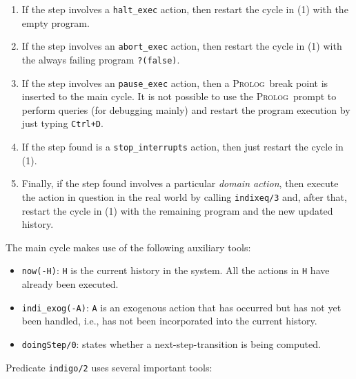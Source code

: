 \documentclass[11pt]{article}
\newcommand{\Prolog}{\mbox{\textsc{Prolog}}}
\begin{document}
\begin{enumerate}
\begin{enumerate}
\begin{enumerate}
\item If the step involves a \texttt{halt\_exec} action, then restart the
cycle in (1) with the empty program.

\item If the step involves an \texttt{abort\_exec} action, then restart the
cycle in (1) with the always failing program \texttt{?(false)}.

\item If the step involves an \texttt{pause\_exec} action, then a
\Prolog\ break point is inserted to the main cycle. It is not possible to
use the \Prolog\ prompt to perform queries (for debugging mainly) and restart
the program execution by just typing \texttt{Ctrl+D}.

\item If the step found is a \texttt{stop\_interrupts} action, then just restart
the cycle in (1).
         
\item Finally, if the step found involves a particular \textit{domain
action}, then execute the action in question in the real world by calling
\texttt{indixeq/3} and, after that, restart the cycle in (1) with the remaining
program and the new updated history.
\end{enumerate}
\end{enumerate}
\end{enumerate}


The main cycle makes use of the following auxiliary tools:

\begin{itemize}
\item \texttt{now(-H)}: \texttt{H} is the current history in the system. All
the actions in \texttt{H} have already been executed.

\item \texttt{indi\_exog(-A)}: \texttt{A} is an exogenous action that has
occurred
  but has not yet been handled, i.e., has not been incorporated into the
  current history.
\item \texttt{doingStep/0}: states whether a next-step-transition is being
  computed.
\end{itemize}

Predicate \texttt{indigo/2} uses several important tools:
\end{document}
